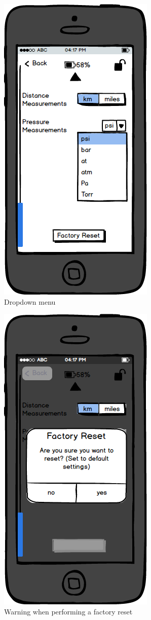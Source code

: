 \documentclass[a4paper]{report}
\begin{document}
\clearpage
\begin{figure}
\centering
\includegraphics[scale=0.9]{figures/prototype_1/settings_2_check}
\caption{Dropdown menu}
\end{figure}
\clearpage
\begin{figure}
\centering
\includegraphics[scale=0.9]{figures/prototype_1/factory_settings}
\caption{Warning when performing a factory reset}
\end{figure}
\end{document}
